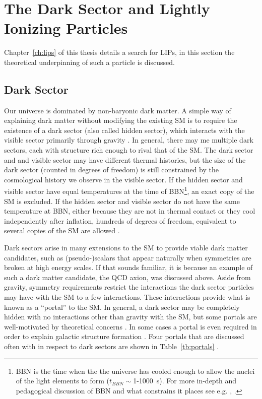 \section{The Dark Sector and Lightly Ionizing Particles}
\label{sec:dark_sector}
Chapter~\ref{ch:lips} of this thesis details a search for \ac{LIP}s, in this section the theoretical underpinning of such a particle is discussed. 

\subsection{Dark Sector}
Our universe is dominated by non-baryonic dark matter. A simple way of explaining dark matter without modifying the existing \ac{SM} is to require the existence of a dark sector (also called hidden sector), which interacts with the visible sector primarily through gravity \cite{Foot2014}. In general, there may me multiple dark sectors, each with structure rich enough to rival that of the \ac{SM}. The dark sector and and visible sector may have different thermal histories, but the size of the dark sector (counted in degrees of freedom) is still constrained by the cosmological history we observe in the visible sector. If the hidden sector and visible sector have equal temperatures at the time of \ac{BBN}\footnote{\ac{BBN} is the time when the the universe has cooled enough to allow the nuclei of the light elements to form ($t_{BBN}\sim$1-1000~s). For more in-depth and pedagogical discussion of \ac{BBN} and what constrains it places see e.g. \cite{Ryden2006}, \cite{Kolb1990}.}, an exact copy of the \ac{SM} is excluded. If the hidden sector and visible sector do not have the same temperature at \ac{BBN}, either because they are not in thermal contact or they cool independently after inflation, hundreds of degrees of freedom, equivalent to several copies of the \ac{SM} are allowed \cite{Feng2010}.

Dark sectors arise in many extensions to the \ac{SM} to provide viable dark matter candidates, such as (pseudo-)scalars that appear naturally when symmetries are broken at high energy scales. If that sounds familiar, it is because an example of such a dark matter candidate, the QCD axion, was discussed above. Aside from gravity, symmetry requirements restrict the interactions the dark sector particles may have with the \ac{SM} to a few interactions. These interactions provide what is known as a ``portal'' to the \ac{SM}. In general, a dark sector may be completely hidden with no interactions other than gravity with the \ac{SM}, but some portals are well-motivated by theoretical concerns \cite{Essig2013} \cite{Feng2010}. In some cases a portal is even required in order to explain galactic structure formation \cite{Foot2014}. Four portals that are discussed often with in respect to dark sectors are shown in Table~\ref{tb:portals} \cite{Essig2013}.

